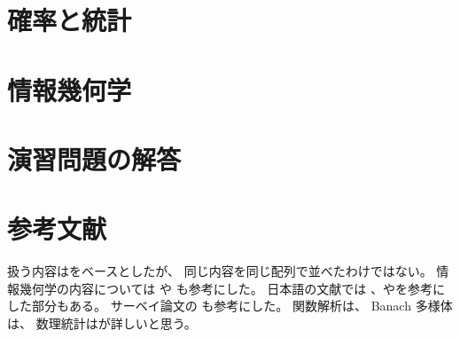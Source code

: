\documentclass[report, notitlepage]{jlreq}
\begin{document}
%
\part{確率と統計}


\part{情報幾何学}


%
\newpage
{}
{}
\part*{演習問題の解答}


%
\newpage
{}
{}
\renewcommand{\bibname}{参考文献}
\markboth{\bibname}{}
\part*{参考文献}

扱う内容は\cite{amari_information_2016}をベースとしたが、
同じ内容を同じ配列で並べたわけではない。
情報幾何学の内容については
\cite{amari_methods_2007}や\cite{ay_information_2017}
も参考にした。
日本語の文献では
\cite{甘利19}、\cite{藤岡21}や\cite{藤原21}を参考にした部分もある。
サーベイ論文の
\cite{nielsen_elementary_2020}も参考にした。
関数解析は\cite{bogachev_real_2020}、
Banach 多様体は\cite{lang_differential_1985}、
数理統計は\cite{吉田06}が詳しいと思う。

{
    \renewcommand{\bibsection}{}
    
    
}

%
\newpage
{}
{}
\printglossary[title={記号一覧; Nomenclature}]

%
\newpage
{}
{}
\printindex
\end{document}
